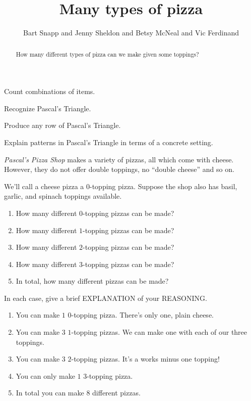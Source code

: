 \documentclass[noauthor,nooutcomes,hints,handout]{ximera}
\author{Bart Snapp and Jenny Sheldon and Betsy McNeal and Vic Ferdinand}
\title{Many types of pizza}
\begin{document}
\begin{abstract}
  How many different types of pizza can we make given some toppings?
\end{abstract}
\maketitle

\begin{listOutcomes}
\item Count combinations of items.
\item Recognize Pascal's Triangle.
\item Produce any row of Pascal's Triangle.
\item Explain patterns in Pascal's Triangle in terms of a concrete
  setting.
\end{listOutcomes}


\textit{Pascal's Pizza Shop} makes a variety of pizzas, all which come
with cheese.  However, they do not offer double
toppings, no ``double cheese'' and so on.


\mynewpage


\begin{question}
  We'll call a cheese pizza a $0$-topping pizza. Suppose the shop also
  has basil, garlic, and spinach toppings available.
\begin{enumerate}
\item How many different $0$-topping pizzas can be made?
\item How many different $1$-topping pizzas can be made?
\item How many different $2$-topping pizzas can be made?
\item How many different $3$-topping pizzas can be made?
\item In total, how many different pizzas can be made?
\end{enumerate}
In each case, give a brief EXPLANATION of your REASONING.
\begin{freeResponse}
  \begin{enumerate}
  \item You can make $1$ $0$-topping pizza. There's only one, plain
    cheese.
  \item You can make $3$ $1$-topping pizzas. We can make one with each
    of our three toppings.
  \item You can make $3$ $2$-topping pizzas. It's a works minus one topping!
  \item You can only make $1$ $3$-topping pizza.
  \item In total you can make $8$ different pizzas.
  \end{enumerate}
\end{freeResponse}
\end{question}
\mynewpage
\end{document}
